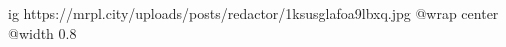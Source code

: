  
 
 
 
 

\ifcmt
  ig https://mrpl.city/uploads/posts/redactor/1ksusglafoa9lbxq.jpg
  @wrap center
  @width 0.8
\fi
